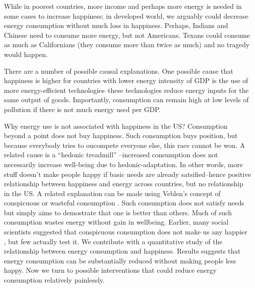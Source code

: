 \documentclass[10pt, letterpaper]{article}
\begin{document}
\begin{spacing}{1.4}
While in poorest countries, more  income and perhaps more energy
 is needed in some cases to increase happiness; in developed world, we arguably could  decrease
energy consumption without much loss in happiness. %
Perhaps, Indians and Chinese need to consume more energy, but not Americans. 
Texans could consume as much as Californians (they consume more than twice as
much) and no tragedy would happen. %

There are a number of possible causal explanations. One possible cause that
happiness is higher for countries with lower energy intensity of GDP is the use
of more energy-efficient technologies--these technologies reduce energy inputs
for the same output of goods. Importantly, consumption can remain high at low
levels of pollution if there is not much energy used per GDP. %

Why energy use is not associated with happiness in the US? 
Consumption beyond a point does not buy happiness. Such consumption buys
position, but because everybody tries to oucompete everyone else, this race
cannot be won. A related cause is a ``hedonic treadmill'' \cite{brickman78cj}--increased consumption does not necessarily increase well-being due to hedonic-adaptation. In other words, more stuff
doesn't make people happy if basic needs are already satsified--hence positive
relationship between happiness and energy across countries, but no relationship
in the US. %
 A related explanation can be made using Veblen's concept of conspicuous or
 wasteful consumption \cite{veblen05a, veblen05b}. Such consumption does not
 satisfy needs but simply aims to demostrate that
one is better than others. Much of such consumption wastes energy without gain
in wellbeing.%
Earlier, many social scientists suggested  that conspicuous consumption
does not make us any happier  \cite{csikszentmihalyi99, frank04, frank05, frank12}, but few actually test it. We contribute with a quantitative study of
the relationship between energy consumption and happiness. %
 Results suggests that  energy consumption can be substantially reduced
without making people less happy.  Now we turn to  possible interventions that could reduce energy consumption
 relatively painlessly. 


\end{spacing}
\end{document}
